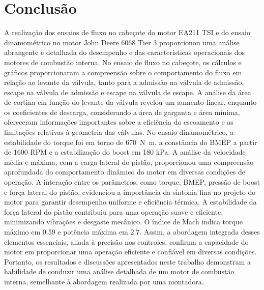 \chapter{Conclusão}

A realização dos ensaios de fluxo no cabeçote do motor EA211 TSI e do ensaio dinamométrico no motor John Deere 6068 Tier 3 proporcionou uma análise abrangente e detalhada do desempenho e das características operacionais dos motores de combustão interna. 
No ensaio de fluxo no cabeçote, os cálculos e gráficos proporcionaram a compreensão sobre o comportamento do fluxo em relação ao levante da válvula, tanto para a admissão na válvula de admissão, escape na válvula de admissão e escape na válvula de escape. 
A análise da área de cortina em função do levante da válvula revelou um aumento linear, enquanto os coeficientes de descarga, considerando a área de garganta e área mínima, ofereceram informações importantes sobre a eficiência do escoamento e as limitações relativas à geometria das válvulas.
No ensaio dinamométrico, a estabilidade do torque foi em torno de \SI{670}{N.m}, a constância do BMEP a partir de 1600 RPM e a estabilização do boost em 180 kPa. A análise da velocidade média e máxima, com a carga lateral do pistão, proporcionou uma compreensão aprofundada do comportamento dinâmico do motor em diversas condições de operação. A interação entre os parâmetros, como torque, BMEP, pressão de boost e força lateral do pistão, evidenciou a importância da sintonia fina no projeto do motor para garantir desempenho uniforme e eficiência térmica. A estabilidade da força lateral do pistão contribuiu para uma operação suave e eficiente, minimizando vibrações e desgaste mecânico. O índice de Mach indica torque máximo em 0.59 e potência máxima em 2.7. Assim, a abordagem integrada desses elementos essenciais, aliada à precisão nos controles, confirma a capacidade do motor em proporcionar uma operação eficiente e confiável em diversas condições.
Portanto, os resultados e discussões apresentados neste trabalho demonstram a habilidade de conduzir uma análise detalhada de um motor de combustão interna, semelhante à abordagem realizada por uma montadora. 